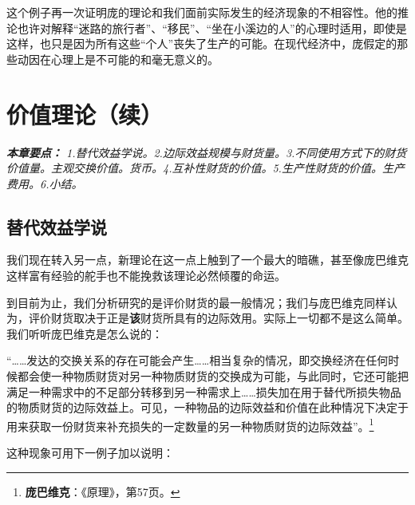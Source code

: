 \documentclass[fontset=fandol, a4paper, 12pt, openright]{ctexbook}
\renewenvironment{quote}
  {\list{}{\rightmargin\leftmargin}%
   \item\relax\small\itshape\color{darkgray}}
  {\endlist}
\begin{document}
这个例子再一次证明庞的理论和我们面前实际发生的经济现象的不相容性。他的推论也许对解释“迷路的旅行者”、“移民”、“坐在小溪边的人”的心理时适用，即使是这样，也只是因为所有这些“个人”丧失了生产的可能。在现代经济中，庞假定的那些动因在心理上是不可能的和毫无意义的。


\chapter{价值理论（续）}

\begin{quote}
\small
\textbf{本章要点：} 1.替代效益学说。2.边际效益规模与财货量。3.不同使用方式下的财货价值量。主观交换价值。货币。4.互补性财货的价值。5.生产性财货的价值。生产费用。6.小结。
\end{quote}

\section{替代效益学说}

我们现在转入另一点，新理论在这一点上触到了一个最大的暗礁，甚至像庞巴维克这样富有经验的舵手也不能挽救该理论必然倾覆的命运。

到目前为止，我们分析研究的是评价财货的最一般情况；我们与庞巴维克同样认为，评价财货取决于正是\textbf{该}财货所具有的边际效用。实际上一切都不是这么简单。我们听听庞巴维克是怎么说的：

“……发达的交换关系的存在可能会产生……相当复杂的情况，即交换经济在任何时候都会使一种物质财货对另一种物质财货的交换成为可能，与此同时，它还可能把满足一种需求中的不足部分转移到另一种需求上……损失加在用于替代所损失物品的物质财货的边际效益上。可见，一种物品的边际效益和价值在此种情况下决定于用来获取一份财货来补充损失的一定数量的另一种物质财货的边际效益”。\footnote{\textbf{庞巴维克}：《原理》，第57页。}

这种现象可用下一例子加以说明：
\end{document}

